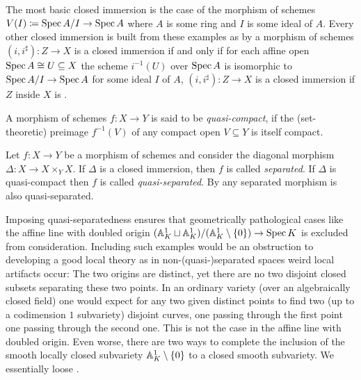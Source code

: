 \begin{example}
	The most basic closed immersion is the case of the morphism of schemes $V(I)\coloneqq \operatorname{Spec} A/I \to \operatorname{Spec} A$ where $A$ is some ring and $I$ is some ideal of $A$. Every other closed immersion is built from these examples as by \cite[\href{https://stacks.math.columbia.edu/tag/01QO}{Tag 01QO}]{stacks-project} a morphism of schemes $(i, i^\sharp)\colon Z\to X$ is a closed immersion if and only if for each affine open $\operatorname{Spec} A\cong U \subseteq X$ the scheme $i^{-1}(U)$ over $\operatorname{Spec} A$ is isomorphic to $\operatorname{Spec} A/I \to \operatorname{Spec} A$ for some ideal $I$ of $A$, \ie $(i, i^\sharp)\colon Z\to X$ is a closed immersion if $Z$ inside $X$ is .
\end{example}

\begin{definition}
	
	A morphism of schemes $f\colon X\to Y$ is said to be \emph{quasi-compact}, if the (set-theoretic) preimage $f^{-1}(V)$ of any compact open $V\subseteq Y$ is itself compact.
\end{definition}

\begin{definition}
	Let $f\colon X\to Y$ be a morphism of schemes and consider the diagonal morphism $\Delta\colon X\to X\times_Y X$. If $\Delta$ is a closed immersion, then $f$ is called \emph{separated}. If $\Delta$ is quasi-compact then $f$ is called \emph{quasi-separated}. By \cite[\href{https://stacks.math.columbia.edu/tag/01K7}{Tag 01K7}]{stacks-project} any separated morphism is also quasi-separated.
\end{definition}

\begin{remark}
	Imposing quasi-separatedness ensures that geometrically pathological cases like the affine line with doubled origin $({\mathbb{A}}_K^1\sqcup {\mathbb{A}}_K^1)/({\mathbb{A}}_K^1\setminus\{0\}) \to \operatorname{Spec} K$ is excluded from consideration. Including such examples would be an obstruction to developing a good local theory as in non-(quasi-)separated spaces weird local artifacts occur: The two origins are distinct, yet there are no two  disjoint closed subsets separating these two points. In an ordinary variety (over an algebraically closed field) one would expect for any two given distinct points to find two (up to a codimension $1$ subvariety) disjoint curves, one passing through the first point one passing through the second one. This is not the case in the affine line with doubled origin. Even worse, there are two ways to complete the inclusion of the smooth locally closed subvariety ${\mathbb{A}}_K^1\setminus\{0\}$ to a closed smooth subvariety. We essentially loose . 
\end{remark}

